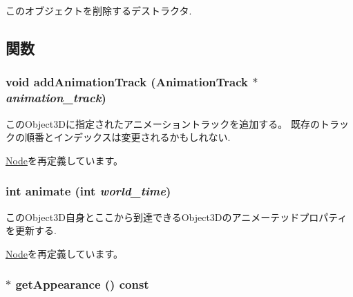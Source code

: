 このオブジェクトを削除するデストラクタ. 

\subsection{関数}
\hypertarget{classm3g_1_1Sprite3D_415c0b110f95410ded9b85e5d99a496b}{
\subsubsection[{addAnimationTrack}]{\setlength{\rightskip}{0pt plus 5cm}void addAnimationTrack ({\bf AnimationTrack} $\ast$ {\em animation\_\-track})}}
\label{classm3g_1_1Sprite3D_415c0b110f95410ded9b85e5d99a496b}


このObject3Dに指定されたアニメーショントラックを追加する。 既存のトラックの順番とインデックスは変更されるかもしれない. 

\hyperlink{classm3g_1_1Node_415c0b110f95410ded9b85e5d99a496b}{Node}を再定義しています。\hypertarget{classm3g_1_1Sprite3D_8aad1ceab4c2a03609c8a42324ce484d}{
\subsubsection[{animate}]{\setlength{\rightskip}{0pt plus 5cm}int animate (int {\em world\_\-time})}}
\label{classm3g_1_1Sprite3D_8aad1ceab4c2a03609c8a42324ce484d}


このObject3D自身とここから到達できるObject3Dのアニメーテッドプロパティを更新する. 

\hyperlink{classm3g_1_1Node_8aad1ceab4c2a03609c8a42324ce484d}{Node}を再定義しています。\hypertarget{classm3g_1_1Sprite3D_0219cb20ddea978a5796b5b414d012d2}{
\subsubsection[{getAppearance}]{ $\ast$ getAppearance () const}}
\label{classm3g_1_1Sprite3D_0219cb20ddea978a5796b5b414d012d2}


